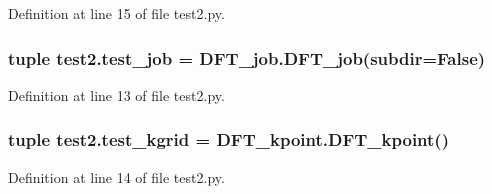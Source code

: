 Definition at line 15 of file test2.\+py.

\hypertarget{namespacetest2_a7200f520502bf46d9abb4c2eb7c826e6}{
\subsubsection[{test\+\_\+job}]{\setlength{\rightskip}{0pt plus 5cm}tuple test2.\+test\+\_\+job = D\+F\+T\+\_\+job.\+D\+F\+T\+\_\+job(subdir=False)}}\label{namespacetest2_a7200f520502bf46d9abb4c2eb7c826e6}


Definition at line 13 of file test2.\+py.

\hypertarget{namespacetest2_afd90e2890ffb36417df41704abb37bee}{
\subsubsection[{test\+\_\+kgrid}]{\setlength{\rightskip}{0pt plus 5cm}tuple test2.\+test\+\_\+kgrid = D\+F\+T\+\_\+kpoint.\+D\+F\+T\+\_\+kpoint()}}\label{namespacetest2_afd90e2890ffb36417df41704abb37bee}


Definition at line 14 of file test2.\+py.

